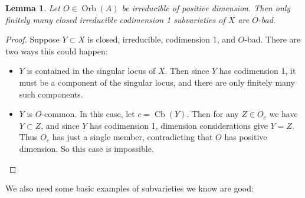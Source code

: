 \documentclass{amsart}
\newtheorem{lemma}[theorem]{Lemma}
\theoremstyle{definition}
\begin{document}
\begin{lemma}\label{L: good cofinite}
    Let $O\in\operatorname{Orb}(A)$ be irreducible of positive dimension. Then only finitely many closed irreducible codimension 1 subvarieties of $X$ are $O$-bad.
\end{lemma}
\begin{proof}
      Suppose $Y\subset X$ is closed, irreducible, codimension 1, and $O$-bad. There are two ways this could happen:
      \begin{itemize}
          \item $Y$ is contained in the singular locus of $X$. Then since $Y$ has codimension 1, it must be a component of the singular locus, and there are only finitely many such components.
          \item $Y$ is $O$-common. In this case, let $c=\operatorname{Cb}(Y)$. Then for any $Z\in O_c$ we have $Y\subset Z$, and since $Y$ has codimension 1, dimension considerations give $Y=Z$. Thus $O_c$ has just a single member, contradicting that $O$ has positive dimension. So this case is impossible.
      \end{itemize}
\end{proof}

We also need some basic examples of subvarieties we know are good:
\end{document}
